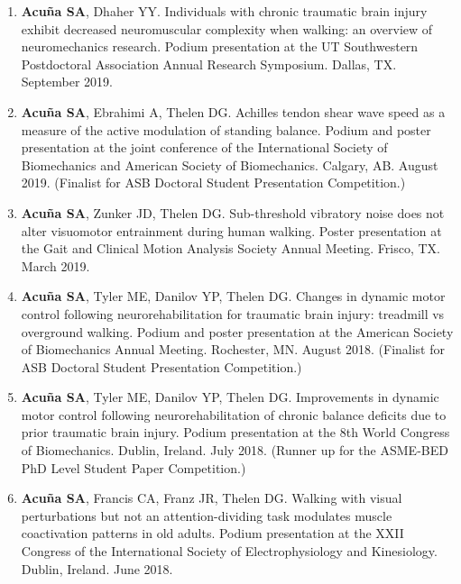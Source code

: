 \documentclass[letterpaper, 10pt]{article}
\begin{document}
\begin{enumerate}
    \item \textbf{Acuña SA}, Dhaher YY. Individuals with chronic traumatic brain injury exhibit decreased neuromuscular complexity when walking: an overview of neuromechanics research. Podium presentation at the UT Southwestern Postdoctoral Association Annual Research Symposium. Dallas, TX. September 2019.
    \item \textbf{Acuña SA}, Ebrahimi A, Thelen DG. Achilles tendon shear wave speed as a measure of the active modulation of standing balance. Podium and poster presentation at the joint conference of the International Society of Biomechanics and American Society of Biomechanics. Calgary, AB. August 2019. (Finalist for ASB Doctoral Student Presentation Competition.)
    \item \textbf{Acuña SA}, Zunker JD, Thelen DG. Sub-threshold vibratory noise does not alter visuomotor entrainment during human walking. Poster presentation at the Gait and Clinical Motion Analysis Society Annual Meeting. Frisco, TX. March 2019.
    \item \textbf{Acuña SA}, Tyler ME, Danilov YP, Thelen DG. Changes in dynamic motor control following neurorehabilitation for traumatic brain injury: treadmill vs overground walking. Podium and poster presentation at the American Society of Biomechanics Annual Meeting. Rochester, MN. August 2018. (Finalist for ASB Doctoral Student Presentation Competition.)
    \item \textbf{Acuña SA}, Tyler ME, Danilov YP, Thelen DG. Improvements in dynamic motor control following neurorehabilitation of chronic balance deﬁcits due to prior traumatic brain injury. Podium presentation at the 8th World Congress of Biomechanics. Dublin, Ireland. July 2018. (Runner up for the ASME-BED PhD Level Student Paper Competition.)
    \item \textbf{Acuña SA}, Francis CA, Franz JR, Thelen DG. Walking with visual perturbations but not an attention-dividing task modulates muscle coactivation patterns in old adults. Podium presentation at the XXII Congress of the International Society of Electrophysiology and Kinesiology. Dublin, Ireland. June 2018.

\end{enumerate}
\end{document}
